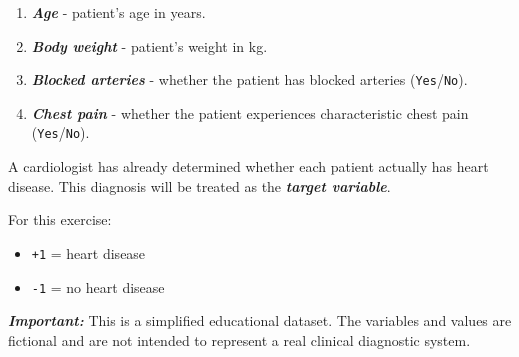 \documentclass[10pt]{article}
\begin{document}
\begin{enumerate}
\item
\textbf{\textit{Age}} - patient's age in years.

\item
\textbf{\textit{Body weight}} - patient's weight in kg.

\item
\textbf{\textit{Blocked arteries}} - whether the patient has blocked arteries (\texttt{Yes}/\texttt{No}).

\item
\textbf{\textit{Chest pain}} - whether the patient experiences characteristic chest pain (\texttt{Yes}/\texttt{No}).

\end{enumerate}
A cardiologist has already determined whether each patient actually has heart disease. This diagnosis will be treated as the \textbf{\textit{target variable}}.

For this exercise:

\begin{itemize}
\item
\texttt{+1} = heart disease

\item
\texttt{-1} = no heart disease

\end{itemize}
\textbf{\textit{Important:}} This is a simplified educational dataset. The variables and values are fictional and are not intended to represent a real clinical diagnostic system.
\end{document}

